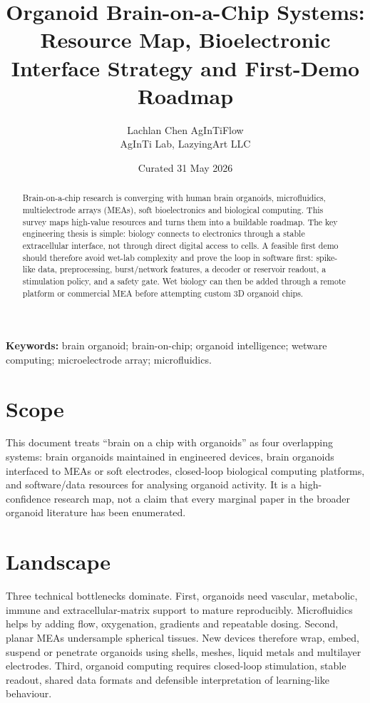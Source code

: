 \documentclass[10pt,twocolumn]{article}
\title{\vspace{-1.5em}\bfseries Organoid Brain-on-a-Chip Systems: Resource Map, Bioelectronic Interface Strategy and First-Demo Roadmap}
\author{\begin{tabular}{c}Lachlan Chen \quad AgInTiFlow\\AgInTi Lab, LazyingArt LLC\end{tabular}}
\date{Curated 31 May 2026}
\begin{document}
\maketitle

\begin{abstract}
\noindent Brain-on-a-chip research is converging with human brain organoids, microfluidics, multielectrode arrays (MEAs), soft bioelectronics and biological computing. This survey maps high-value resources and turns them into a buildable roadmap. The key engineering thesis is simple: biology connects to electronics through a stable extracellular interface, not through direct digital access to cells. A feasible first demo should therefore avoid wet-lab complexity and prove the loop in software first: spike-like data, preprocessing, burst/network features, a decoder or reservoir readout, a stimulation policy, and a safety gate. Wet biology can then be added through a remote platform or commercial MEA before attempting custom 3D organoid chips.
\end{abstract}

\textbf{Keywords:} brain organoid; brain-on-chip; organoid intelligence; wetware computing; microelectrode array; microfluidics.

\section{Scope}

This document treats ``brain on a chip with organoids'' as four overlapping systems: brain organoids maintained in engineered devices, brain organoids interfaced to MEAs or soft electrodes, closed-loop biological computing platforms, and software/data resources for analysing organoid activity. It is a high-confidence research map, not a claim that every marginal paper in the broader organoid literature has been enumerated.

\section{Landscape}

Three technical bottlenecks dominate. First, organoids need vascular, metabolic, immune and extracellular-matrix support to mature reproducibly. Microfluidics helps by adding flow, oxygenation, gradients and repeatable dosing. Second, planar MEAs undersample spherical tissues. New devices therefore wrap, embed, suspend or penetrate organoids using shells, meshes, liquid metals and multilayer electrodes. Third, organoid computing requires closed-loop stimulation, stable readout, shared data formats and defensible interpretation of learning-like behaviour.
\end{document}

